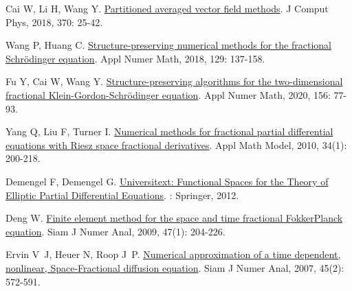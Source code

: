\begin{thebibliography}{77}
    Cai W, Li H, Wang Y.
    \newblock \href{https://linkinghub.elsevier.com/retrieve/pii/S0021999118303012}{Partitioned averaged vector field methods}\allowbreak[J].
    \newblock J Comput Phys, 2018, 370: 25-42.
    
    Wang P, Huang C.
    \newblock \href{https://linkinghub.elsevier.com/retrieve/pii/S0168927418300709}{Structure-preserving numerical methods for the fractional {{Schr{\"o}dinger}} equation}\allowbreak[J].
    \newblock Appl Numer Math, 2018, 129: 137-158.
    
    Fu Y, Cai W, Wang Y.
    \newblock \href{https://www.sciencedirect.com/science/article/pii/S0168927420301264}{Structure-preserving algorithms for the two-dimensional fractional {{Klein-Gordon-Schr{\"o}dinger}} equation}\allowbreak[J].
    \newblock Appl Numer Math, 2020, 156: 77-93.
    
    Yang Q, Liu F, Turner I.
    \newblock \href{https://www.sciencedirect.com/science/article/pii/S0307904X09001127}{Numerical methods for fractional partial differential equations with {{Riesz}} space fractional derivatives}\allowbreak[J].
    \newblock Appl Math Model, 2010, 34\allowbreak (1): 200-218.
    
    Demengel F, Demengel G.
    \newblock \href{http://link.springer.com/10.1007/978-1-4471-2807-6}{Universitext: Functional {{Spaces}} for the {{Theory}} of {{Elliptic Partial Differential Equations}}}\allowbreak[M].
    : {Springer}, 2012.
    
    Deng W.
    \newblock \href{https://doi.org/10.1137/080714130}{Finite element method for the space and time fractional {{Fokker}}{\textendash}{{Planck}} equation}\allowbreak[J].
    \newblock Siam J Numer Anal, 2009, 47\allowbreak (1): 204-226.
    
    Ervin V~J, Heuer N, Roop J~P.
    \newblock \href{https://doi.org/10.1137/050642757}{Numerical approximation of a time dependent, nonlinear, {{Space}}-{{Fractional}} diffusion equation}\allowbreak[J].
    \newblock Siam J Numer Anal, 2007, 45\allowbreak (2): 572-591.
    

\end{thebibliography}
